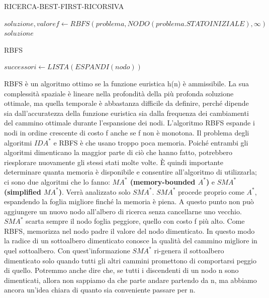 \documentclass{article}
\begin{document}
\begin{center}
\begin{algorithm}
\caption{RICERCA-BEST-FIRST-RICORSIVA}
$soluzione,valoref\leftarrow RBFS(problema, NODO(problema.STATOINIZIALE),\infty)$\;
\Return $soluzione$\;
\end{algorithm}
\newpage
{}
\begin{algorithm}
\caption{RBFS}
$successori\leftarrow LISTA(ESPANDI(nodo))$\;
\end{algorithm}
\end{center}
RBFS è un algoritmo ottimo se la funzione euristica h(n) è ammissibile. La sua complessità spaziale è lineare nella profondità della più profonda soluzione ottimale, ma quella temporale è abbastanza difficile da definire, perché dipende sia dall'accuratezza della funzione euristica sia dalla frequenza dei cambiamenti del cammino ottimale durante l'espansione dei nodi. L'algoritmo RBFS espande i nodi in ordine crescente di costo f anche se f non è monotona.\newline
Il problema degli algoritmi $IDA^*$ e RBFS è che usano troppo poca memoria.
Poiché entrambi gli algoritmi dimenticano la maggior parte di ciò che hanno fatto, potrebbero riesplorare nuovamente gli stessi stati molte volte. È quindi importante determinare quanta memoria è disponibile e consentire all'algoritmo di utilizzarla; ci sono due algoritmi che lo fanno: \textbf{$MA^*$ (memory-bounded $A^*$)} e \textbf{$SMA^*$ (simplified $MA^*$)}. Verrà analizzato solo $SMA^*$.\newline
\textbf{$SMA^*$} procede proprio come $A^*$, espandendo la foglia migliore finché la memoria è piena. A questo punto non può aggiungere un nuovo nodo all'albero di ricerca senza cancellarne uno vecchio. $SMA^*$ scarta sempre il nodo foglia peggiore, quello con costo f più alto. Come RBFS, memorizza nel nodo padre il valore del nodo dimenticato. In questo modo la radice di un sottoalbero dimenticato conosce la qualità del cammino migliore in quel sottoalbero. Con quest'informazione $SMA^*$ ri-genera il sottoalbero dimenticato solo quando tutti gli altri cammini promettono di comportarsi peggio di quello. Potremmo anche dire che, se tutti i discendenti di un nodo n sono dimenticati, allora non sappiamo da che parte andare partendo da n, ma abbiamo ancora un'idea chiara di quanto sia conveniente passare per n.\newline
\end{document}
